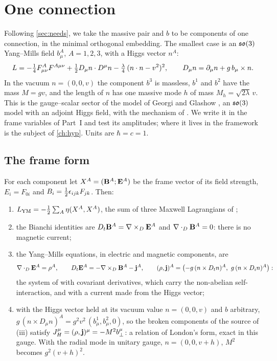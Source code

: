 \chapter{One connection}
\label{ch:connection}

Following \cref{sec:needs}, we take the massive pair and $b$ to be components of one connection, in the minimal orthogonal embedding. The
smallest case is an $\mathfrak{so}(3)$ Yang--Mills field $b^A_\mu$, $A=1,2,3$, with a Higgs vector $n^A$:
\begin{equation}
\label{eq:Lcomp}
L=-\tfrac14F^A_{\mu\nu}F^{A\mu\nu}+\tfrac12 D_\mu n\cdot D^\mu n-\tfrac\lambda4\,(n\cdot n-v^2)^2,\qquad D_\mu n=\partial_\mu n+g\,b_\mu\times n .
\end{equation}
In the vacuum $n=(0,0,v)$ the component $b^3$ is massless, $b^1$ and $b^2$ have the mass $M=gv$, and the length of $n$ has one massive mode
$h$ of mass $M_h=\sqrt{2\lambda}\,v$. This is the gauge--scalar sector of the model of Georgi and Glashow \cite{GeorgiGlashowPRL72}, an $\mathfrak{so}(3)$
model with an adjoint Higgs field, with the mechanism of \cite{EnglertBrout64,Higgs64}. We write it in the frame variables of Part~I and test its amplitudes; where it lives in the framework is the
subject of \cref{ch:hyp}. Units are $\hbar=c=1$.

\section{The frame form}

\begin{theorem}
\label{thm:frame}
For each component let $X^A=(\mathbf B^A;\mathbf E^A)$ be the frame vector of its field strength, $E_i=F_{0i}$ and $B_i=\tfrac12\epsilon_{ijk}F_{jk}$. Then:
\begin{enumerate}[label=(\roman*),leftmargin=2.2em,itemsep=1pt]
\item $L_{\rm YM}=-\tfrac12\sum_A\eta(X^A,X^A)$, the sum of three Maxwell Lagrangians of ;
\item the Bianchi identities are $D_t\mathbf B^A=\nabla\times_D\mathbf E^A$ and $\nabla\cdot_D\mathbf B^A=0$: there is no magnetic current;
\item the Yang--Mills equations, in electric and magnetic components, are
\[
\nabla\cdot_D\mathbf E^A=\rho^A,\qquad D_t\mathbf E^A=-\nabla\times_D\mathbf B^A-\mathbf j^A,\qquad (\rho,\mathbf j)^A=\bigl(-g\,(n\times D_tn)^A,\ g\,(n\times D_in)^A\bigr):
\]
the system of  with covariant derivatives, which carry the non-abelian self-interaction, and with a current made from the
Higgs vector;
\item with the Higgs vector held at its vacuum value $n=(0,0,v)$ and $b$ arbitrary, $g\,(n\times D_\mu n)^A=g^2v^2\,(b^1_\mu,b^2_\mu,0)$, so the
broken components of the source of (iii) satisfy $J^\mu_H=(\rho,\mathbf j)^\mu=-M^2b^\mu_\perp$: a relation of London's form, exact in this gauge.
With the radial mode in unitary gauge, $n=(0,0,v+h)$, $M^2$ becomes $g^2(v+h)^2$.
\end{enumerate}
\end{theorem}

